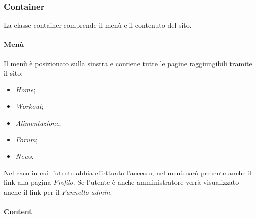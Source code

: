 \subsubsection{Container}
La classe container comprende il menù e il contenuto del sito.
\paragraph{Menù}
Il menù è posizionato sulla sinstra e contiene tutte le pagine raggiungibili tramite il sito:
\begin{itemize}
	\item \textit{Home};
	\item \textit{Workout};
	\item \textit{Alimentazione};
	\item \textit{Forum};
	\item \textit{News}.
\end{itemize}
Nel caso in cui l'utente abbia effettuato l'accesso, nel menù sarà presente anche il link alla pagina \textit{Profilo}. Se l'utente è anche amministratore verrà visualizzato anche il link per il \textit{Pannello admin}.
\paragraph{Content}